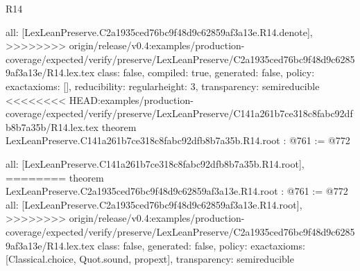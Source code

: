 \begin{lexlean}{R14}
\begin{coremodule}
{{{{{{{{{{{{  all: [LexLeanPreserve.C2a1935ced76bc9f48d9c62859af3a13e.R14.denote],
>>>>>>>> origin/release/v0.4:examples/production-coverage/expected/verify/preserve/LexLeanPreserve/C2a1935ced76bc9f48d9c62859af3a13e/R14.lex.tex
  class: false,
  compiled: true,
  generated: false,
  policy: exact{axioms: []},
  reducibility: regular{height: 3},
  transparency: semireducible
}
<<<<<<<< HEAD:examples/production-coverage/expected/verify/preserve/LexLeanPreserve/C141a261b7ce318c8fabc92dfb8b7a35b/R14.lex.tex
theorem LexLeanPreserve.C141a261b7ce318c8fabc92dfb8b7a35b.R14.root : @761 := @772 {
  all: [LexLeanPreserve.C141a261b7ce318c8fabc92dfb8b7a35b.R14.root],
========
theorem LexLeanPreserve.C2a1935ced76bc9f48d9c62859af3a13e.R14.root : @761 := @772 {
  all: [LexLeanPreserve.C2a1935ced76bc9f48d9c62859af3a13e.R14.root],
>>>>>>>> origin/release/v0.4:examples/production-coverage/expected/verify/preserve/LexLeanPreserve/C2a1935ced76bc9f48d9c62859af3a13e/R14.lex.tex
  class: false,
  generated: false,
  policy: exact{axioms: [Classical.choice, Quot.sound, propext]},
  transparency: semireducible
}

}}}}}}}}}}}}
\end{coremodule}
\end{lexlean}
